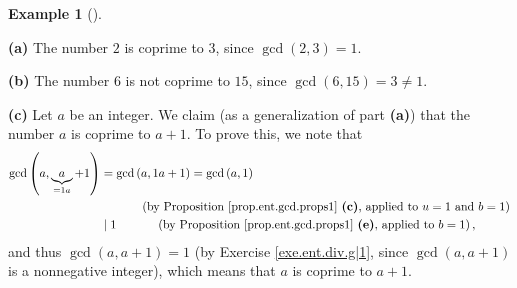 \documentclass[numbers=enddot,12pt,final,onecolumn,notitlepage]{scrartcl}%
\numberwithin{exer}{subsection}
\theoremstyle{definition}
\newtheorem{exam}[theo]{Example}
\newenvironment{example}[1][]
{\begin{exam}[#1]\begin{leftbar}}
{\end{leftbar}\end{exam}}
\begin{document}
\begin{example}
\label{exa.ent.coprime.1}\textbf{(a)} The number $2$ is coprime to $3$, since
$\gcd\left(  2,3\right)  =1$.

\textbf{(b)} The number $6$ is not coprime to $15$, since $\gcd\left(
6,15\right)  =3\neq1$.

\textbf{(c)} Let $a$ be an integer. We claim (as a generalization of part
\textbf{(a)}) that the number $a$ is coprime to $a+1$. To prove this, we note
that%
\begin{align*}
\gcd\left(  a,\underbrace{a}_{=1a}+1\right)   &  =\gcd\left(  a,1a+1\right)
=\gcd\left(  a,1\right) \\
&  \ \ \ \ \ \ \ \ \ \ \left(  \text{by Proposition \ref{prop.ent.gcd.props1}
\textbf{(c)}, applied to }u=1\text{ and }b=1\right) \\
&  \mid1\ \ \ \ \ \ \ \ \ \ \left(  \text{by Proposition
\ref{prop.ent.gcd.props1} \textbf{(e)}, applied to }b=1\right)  ,
\end{align*}
and thus $\gcd\left(  a,a+1\right)  =1$ (by Exercise \ref{exe.ent.div.g|1},
since $\gcd\left(  a,a+1\right)  $ is a nonnegative integer), which means that
$a$ is coprime to $a+1$.


\end{example}
\end{document}
